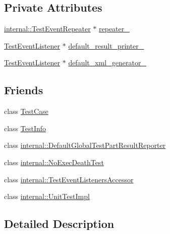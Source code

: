 \subsection*{Private Attributes}
\begin{DoxyCompactItemize}
\item 
\hyperlink{classtesting_1_1internal_1_1TestEventRepeater}{internal\+::\+Test\+Event\+Repeater} $\ast$ \hyperlink{classtesting_1_1TestEventListeners_a625d58b951893e80cde12862aece6fd8}{repeater\+\_\+}
\item 
\hyperlink{classtesting_1_1TestEventListener}{Test\+Event\+Listener} $\ast$ \hyperlink{classtesting_1_1TestEventListeners_a9ff9ebc31a9a52e5f108661cfcb7ecd9}{default\+\_\+result\+\_\+printer\+\_\+}
\item 
\hyperlink{classtesting_1_1TestEventListener}{Test\+Event\+Listener} $\ast$ \hyperlink{classtesting_1_1TestEventListeners_a018a3952aa10c19251b88f27abe373d3}{default\+\_\+xml\+\_\+generator\+\_\+}
\end{DoxyCompactItemize}
\subsection*{Friends}
\begin{DoxyCompactItemize}
\item 
class \hyperlink{classtesting_1_1TestEventListeners_aff779e55b06adfa7c0088bd10253f0f0}{Test\+Case}
\item 
class \hyperlink{classtesting_1_1TestEventListeners_a4c49c2cdb6c328e6b709b4542f23de3c}{Test\+Info}
\item 
class \hyperlink{classtesting_1_1TestEventListeners_abae39633da9932847b41cb80efd62115}{internal\+::\+Default\+Global\+Test\+Part\+Result\+Reporter}
\item 
class \hyperlink{classtesting_1_1TestEventListeners_afddba49fdf3f493532b4d5efb9814f4e}{internal\+::\+No\+Exec\+Death\+Test}
\item 
class \hyperlink{classtesting_1_1TestEventListeners_addbc107b6b445617c880182bd4f44cf9}{internal\+::\+Test\+Event\+Listeners\+Accessor}
\item 
class \hyperlink{classtesting_1_1TestEventListeners_acc0a5e7573fd6ae7ad1878613bb86853}{internal\+::\+Unit\+Test\+Impl}
\end{DoxyCompactItemize}


\subsection{Detailed Description}


